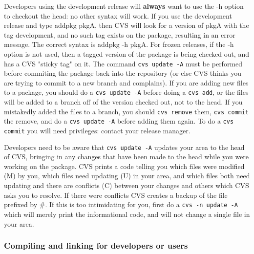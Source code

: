 \documentclass[12pt]{article}
\begin{document}
\begin{itemize}
Developers using the development release will {\bf always} want to use the
-h option to checkout the head: no other syntax will work.  
 If you use the 
development release and type {\ttfamily addpkg pkgA}, then CVS will look
for a version of {\ttfamily pkgA} with the tag {\ttfamily development}, and
no such tag exists on the package, resulting in an error message.
The correct syntax is {\ttfamily addpkg -h pkgA}.
For frozen releases, if the -h option is not used, then a tagged version of the 
package is 
being checked out, and has a CVS "sticky tag" on it. The 
command 
\texttt{cvs update -A} must be 
performed before commiting the package back into the
repository (or else CVS thinks you are trying to 
commit to a new branch and
complains). If you are adding new files to a package, you should do a 
\texttt{cvs update -A} before doing a 
\texttt{cvs add}, or the files will be 
added to a branch off of the version checked out, not to the head.  If you 
mistakedly added the files to a branch, you should 
\texttt{cvs remove} them, 
\texttt{cvs commit} the remove, and do a 
\texttt{cvs update -A} before adding 
them again. To do a \texttt{cvs commit} you will need privileges: contact
your release manager.

Developers need to be aware that 
\texttt{cvs update -A} updates your area to
the head of CVS, bringing in any changes that have been made 
to the head 
while you were working on the package.  CVS 
prints a code telling you which files were modified (M) by you, which files 
need
updating (U) in your area, and which files both need updating and there are
conflicts (C) between your changes and others which 
CVS asks you to resolve.
If there were conflicts CVS creates a backup of 
the file prefixed by \#.
If this is too intimidating for you, 
first do a \texttt{cvs -n update -A} which will 
merely print the informational code, and will not change a single file in your 
area.  
\end{itemize}

\subsubsection{Compiling and linking for developers or users}
\label{sec_debug}
\end{document}
